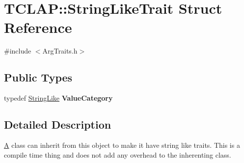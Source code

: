 \hypertarget{struct_t_c_l_a_p_1_1_string_like_trait}{\section{T\+C\+L\+A\+P\+:\+:String\+Like\+Trait Struct Reference}
\label{struct_t_c_l_a_p_1_1_string_like_trait}
}


{\ttfamily \#include $<$Arg\+Traits.\+h$>$}

\subsection*{Public Types}
\begin{DoxyCompactItemize}
\item 
\hypertarget{struct_t_c_l_a_p_1_1_string_like_trait_a7a081c80b731414dcad1b50cf80b7433}{typedef \hyperlink{struct_t_c_l_a_p_1_1_string_like}{String\+Like} {\bfseries Value\+Category}}\label{struct_t_c_l_a_p_1_1_string_like_trait_a7a081c80b731414dcad1b50cf80b7433}

\end{DoxyCompactItemize}


\subsection{Detailed Description}
\hyperlink{class_a}{A} class can inherit from this object to make it have string like traits. This is a compile time thing and does not add any overhead to the inherenting class. 